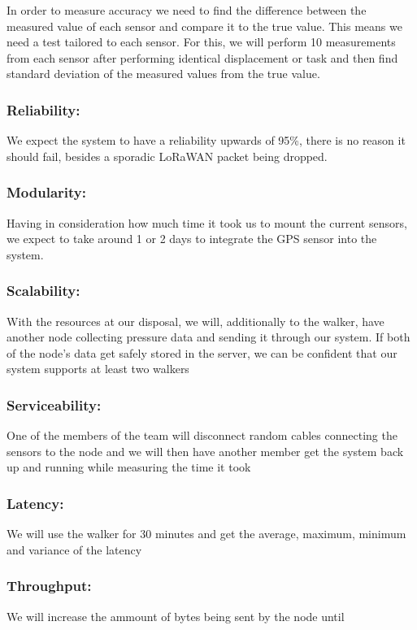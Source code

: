 In order to measure accuracy we need to find the difference between the measured value of each sensor and compare it to the true value. This means we need a test tailored to each sensor. For this, we will perform 10 measurements from each sensor after performing identical displacement or task and then find standard deviation of the measured values from the true value.

\subsubsection{Reliability:}
We expect the system to have a reliability upwards of 95\%, there is no reason it should fail, besides a sporadic LoRaWAN packet being dropped.

\subsubsection{Modularity:}
Having in consideration how much time it took us to mount the current sensors, we expect to take around 1 or 2 days to integrate the GPS sensor into the system.

\subsubsection{Scalability:}
With the resources at our disposal, we will, additionally to the walker, have another node collecting pressure data and sending it through our system. If both of the node’s data get safely stored in the server, we can be confident that our system supports at least two walkers

\subsubsection{Serviceability:}
One of the members of the team will disconnect random cables connecting the sensors to the node and we will then have another member get the system back up and running while measuring the time it took

\subsubsection{Latency:}
We will use the walker for 30 minutes and get the average, maximum, minimum and variance of the latency

\subsubsection{Throughput:}
We will increase the ammount of bytes being sent by the node until 

